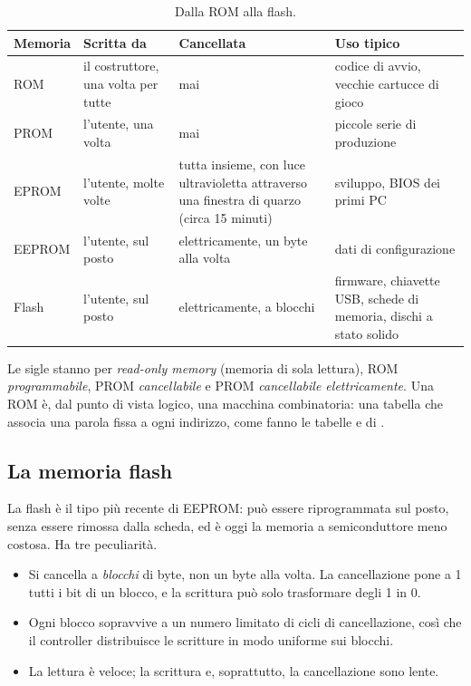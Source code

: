 \begin{table}[htb]
\centering\small
\caption{Dalla ROM alla flash.}\label{tab:st:rom}
\begin{tabularx}{\textwidth}{@{}lP{0.24\textwidth}LL@{}}
\toprule
\textbf{Memoria} & \textbf{Scritta da} & \textbf{Cancellata} & \textbf{Uso tipico}\\
\midrule
ROM & il costruttore, una volta per tutte & mai & codice di avvio, vecchie cartucce di gioco\\
PROM & l'utente, una volta & mai & piccole serie di produzione\\
EPROM & l'utente, molte volte & tutta insieme, con luce ultravioletta attraverso una finestra di quarzo (circa 15 minuti) & sviluppo, BIOS dei primi PC\\
EEPROM & l'utente, sul posto & elettricamente, un byte alla volta & dati di configurazione\\
Flash & l'utente, sul posto & elettricamente, a blocchi & firmware, chiavette USB, schede di memoria, dischi a stato solido\\
\bottomrule
\end{tabularx}
\end{table}

Le sigle stanno per \emph{read-only memory} (memoria di sola lettura), ROM
\emph{programmabile}, PROM \emph{cancellabile} e PROM \emph{cancellabile
elettricamente}. Una ROM è, dal punto di vista logico, una macchina
combinatoria: una tabella che associa una parola fissa a ogni indirizzo, come
fanno le tabelle  e  di \vermone.

\subsection{La memoria flash}

La flash è il tipo più recente di EEPROM: può essere riprogrammata sul posto,
senza essere rimossa dalla scheda, ed è oggi la memoria a semiconduttore meno
costosa. Ha tre peculiarità.

\begin{itemize}
\item Si cancella a \emph{blocchi} di byte, non un byte alla volta. La
  cancellazione pone a 1 tutti i bit di un blocco, e la scrittura può solo
  trasformare degli 1 in 0.
\item Ogni blocco sopravvive a un numero limitato di cicli di cancellazione,
  così che il controller distribuisce le scritture in modo uniforme sui
  blocchi.
\item La lettura è veloce; la scrittura e, soprattutto, la cancellazione sono
  lente.
\end{itemize}

